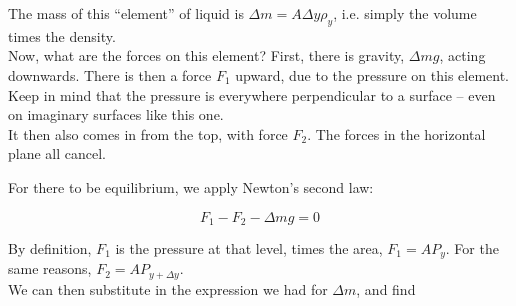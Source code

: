 \begin{figure}[H]
  \centering
{}
\end{figure}


The mass of this ``element'' of liquid is $\Delta m = A \Delta y \rho_y$, i.e. simply the volume times the density.\\
Now, what are the forces on this element? First, there is gravity, $\Delta m g$, acting downwards. There is then a force $F_1$ upward, due to the pressure on this element. Keep in mind that the pressure is everywhere perpendicular to a surface -- even on imaginary surfaces like this one.\\
It then also comes in from the top, with force $F_2$. The forces in the horizontal plane all cancel.

For there to be equilibrium, we apply Newton's second law:

\begin{equation}
F_1 - F_2 - \Delta m g = 0
\end{equation}

By definition, $F_1$ is the pressure at that level, times the area, $F_1 = A P_y$. For the same reasons, $F_2 = A P_{y + \Delta y}$.\\
We can then substitute in the expression we had for $\Delta m$, and find

